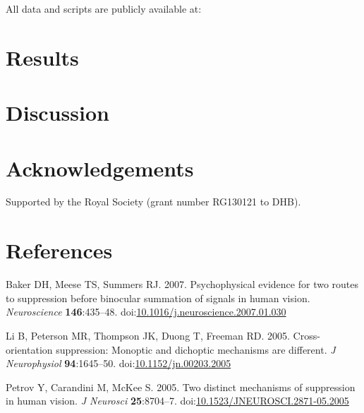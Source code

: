 \documentclass[]{article}
\begin{document}
All data and scripts are publicly available at:

\hypertarget{results}{%
\section{Results}\label{results}}

\hypertarget{discussion}{%
\section{Discussion}\label{discussion}}

\hypertarget{acknowledgements}{%
\section{Acknowledgements}\label{acknowledgements}}

Supported by the Royal Society (grant number RG130121 to DHB).

\hypertarget{references}{%
\section*{References}\label{references}}

\hypertarget{refs}{}
\leavevmode\hypertarget{ref-Baker2007}{}%
Baker DH, Meese TS, Summers RJ. 2007. Psychophysical evidence for two routes to suppression before binocular summation of signals in human vision. \emph{Neuroscience} \textbf{146}:435--48. doi:\href{https://doi.org/10.1016/j.neuroscience.2007.01.030}{10.1016/j.neuroscience.2007.01.030}

\leavevmode\hypertarget{ref-Li2005}{}%
Li B, Peterson MR, Thompson JK, Duong T, Freeman RD. 2005. Cross-orientation suppression: Monoptic and dichoptic mechanisms are different. \emph{J Neurophysiol} \textbf{94}:1645--50. doi:\href{https://doi.org/10.1152/jn.00203.2005}{10.1152/jn.00203.2005}

\leavevmode\hypertarget{ref-Petrov2005}{}%
Petrov Y, Carandini M, McKee S. 2005. Two distinct mechanisms of suppression in human vision. \emph{J Neurosci} \textbf{25}:8704--7. doi:\href{https://doi.org/10.1523/JNEUROSCI.2871-05.2005}{10.1523/JNEUROSCI.2871-05.2005}
\end{document}
